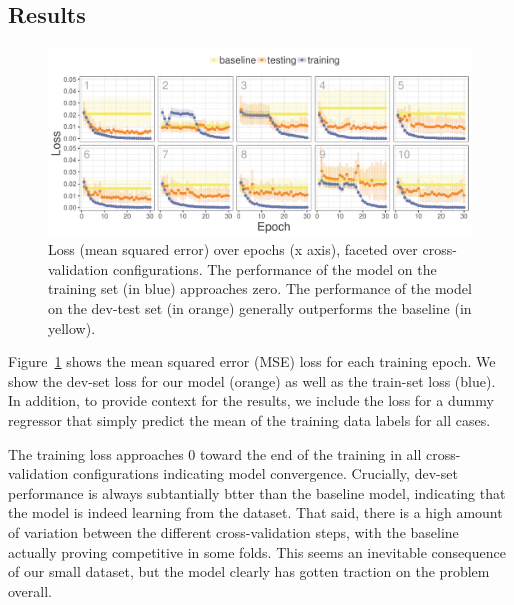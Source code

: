 \documentclass[11pt,a4paper]{article}
\begin{document}


\subsection{Results}

\begin{figure}
	\includegraphics[width=\linewidth]{graphs/lossPlotCropped.pdf}
	\caption{Loss (mean squared error) over epochs (x axis), faceted over cross-validation configurations. The performance of the model on the training set (in blue) approaches zero. The performance of the model on the dev-test set (in orange) generally outperforms the baseline (in yellow).}
	\label{fig:loss}
\end{figure}

Figure~\ref{fig:loss} shows the mean squared error (MSE) loss for each training epoch. We show the dev-set loss for our model (orange) as well as the train-set loss (blue). In addition, to provide context for the results, we include the loss for a dummy regressor that simply predict the mean of the training data labels for all cases.

The training loss approaches 0 toward the end of the training in all cross-validation configurations indicating model convergence. Crucially, dev-set performance is always subtantially btter than the baseline model, indicating that the model is indeed learning from the dataset. That said, there is a high amount of variation between the different cross-validation steps, with the baseline actually proving competitive in some folds. This seems an inevitable consequence of our small dataset, but the model clearly has gotten traction on the problem overall.
\end{document}
